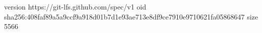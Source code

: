 version https://git-lfs.github.com/spec/v1
oid sha256:408faf89a5a9ccf9a918d01b7d1e93ae713e8df9ce7910e9710621fa05868647
size 5566
